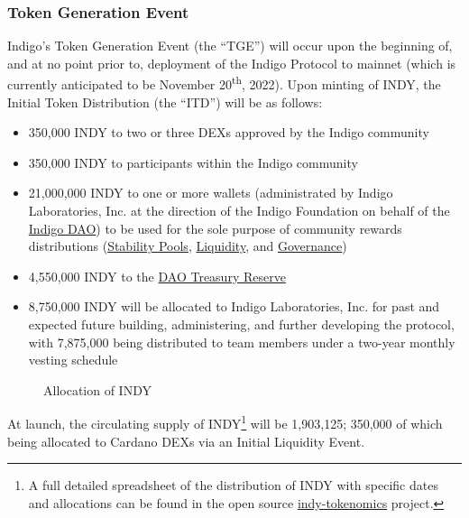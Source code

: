 \documentclass{article}
\begin{document}
\begin{sloppypar}
{\subsubsection{Token Generation Event}\label{token-generation-event}}

Indigo's Token Generation Event (the ``TGE'') will occur upon the
beginning of, and at no point prior to, deployment of the Indigo
Protocol to mainnet (which is currently anticipated to be November
20\textsuperscript{th}, 2022). Upon minting of INDY, the Initial Token
Distribution (the ``ITD'') will be as follows:

\begin{itemize}
\item
  350,000 INDY to two or three DEXs approved by the Indigo community
\item
  350,000 INDY to participants within the Indigo community
\item
  21,000,000 INDY to one or more wallets (administrated by Indigo
  Laboratories, Inc. at the direction of the Indigo Foundation on behalf
  of the \protect\hyperlink{governance}{Indigo DAO}) to be used for the
  sole purpose of community rewards distributions
  (\protect\hyperlink{stability-pool-staking-rewards}{Stability Pools},
  \protect\hyperlink{liquidity-staking-rewards}{Liquidity}, and
  \protect\hyperlink{staking}{Governance})
\item
  4,550,000 INDY to the \protect\hyperlink{indigo-dao-treasury}{DAO
  Treasury Reserve}
\item
  8,750,000 INDY will be allocated to Indigo Laboratories, Inc. for past
  and expected future building, administering, and further developing
  the protocol, with 7,875,000 being distributed to team members under a
  two-year monthly vesting schedule
\end{itemize}

\hypertarget{indy-piechart}{%
\begin{figure}[htbp]
\centering

\caption{Allocation of INDY}
\end{figure}}

At launch, the circulating supply of INDY\footnote{A full detailed
  spreadsheet of the distribution of INDY with specific dates and
  allocations can be found in the open source
  \href{https://github.com/IndigoProtocol/indy-tokenomics}{indy-tokenomics}
  project.} will be 1,903,125; 350,000 of which being allocated to
Cardano DEXs via an Initial Liquidity Event.


\end{sloppypar}
\end{document}
